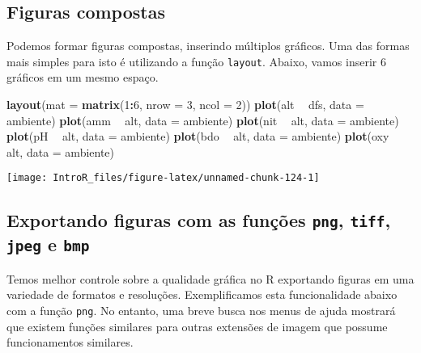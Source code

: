 \documentclass[
]{book}
\newenvironment{Shaded}{\begin{snugshade}}{\end{snugshade}}
\newcommand{\DataTypeTok}[1]{\textcolor[rgb]{0.13,0.29,0.53}{#1}}
\newcommand{\DecValTok}[1]{\textcolor[rgb]{0.00,0.00,0.81}{#1}}
\newcommand{\KeywordTok}[1]{\textcolor[rgb]{0.13,0.29,0.53}{\textbf{#1}}}
\newcommand{\NormalTok}[1]{#1}
\newcommand{\OperatorTok}[1]{\textcolor[rgb]{0.81,0.36,0.00}{\textbf{#1}}}
\newcommand{\StringTok}[1]{\textcolor[rgb]{0.31,0.60,0.02}{#1}}
\begin{document}
\hypertarget{figuras-compostas}{%
\subsection{Figuras compostas}\label{figuras-compostas}}

Podemos formar figuras compostas, inserindo múltiplos gráficos. Uma das formas mais simples para isto é utilizando a função \texttt{layout}. Abaixo, vamos inserir 6 gráficos em um mesmo espaço.

\begin{Shaded}
\begin{Highlighting}[]
\KeywordTok{layout}\NormalTok{(}\DataTypeTok{mat =} \KeywordTok{matrix}\NormalTok{(}\DecValTok{1}\OperatorTok{:}\DecValTok{6}\NormalTok{, }\DataTypeTok{nrow =} \DecValTok{3}\NormalTok{, }\DataTypeTok{ncol =} \DecValTok{2}\NormalTok{))}
\KeywordTok{plot}\NormalTok{(alt }\OperatorTok{~}\StringTok{ }\NormalTok{dfs, }\DataTypeTok{data =}\NormalTok{ ambiente)}
\KeywordTok{plot}\NormalTok{(amm }\OperatorTok{~}\StringTok{ }\NormalTok{alt, }\DataTypeTok{data =}\NormalTok{ ambiente)}
\KeywordTok{plot}\NormalTok{(nit }\OperatorTok{~}\StringTok{ }\NormalTok{alt, }\DataTypeTok{data =}\NormalTok{ ambiente)}
\KeywordTok{plot}\NormalTok{(pH }\OperatorTok{~}\StringTok{ }\NormalTok{alt, }\DataTypeTok{data =}\NormalTok{ ambiente)}
\KeywordTok{plot}\NormalTok{(bdo }\OperatorTok{~}\StringTok{ }\NormalTok{alt, }\DataTypeTok{data =}\NormalTok{ ambiente)}
\KeywordTok{plot}\NormalTok{(oxy }\OperatorTok{~}\StringTok{ }\NormalTok{alt, }\DataTypeTok{data =}\NormalTok{ ambiente)}
\end{Highlighting}
\end{Shaded}

\begin{center}\texttt{[image: IntroR\_files/figure-latex/unnamed-chunk-124-1]} \end{center}

\hypertarget{exportando-figuras-com-as-funuxe7uxf5es-png-tiff-jpeg-e-bmp}{%
\subsection{\texorpdfstring{Exportando figuras com as funções \texttt{png}, \texttt{tiff}, \texttt{jpeg} e \texttt{bmp}}{Exportando figuras com as funções png, tiff, jpeg e bmp}}\label{exportando-figuras-com-as-funuxe7uxf5es-png-tiff-jpeg-e-bmp}}

Temos melhor controle sobre a qualidade gráfica no R exportando figuras em uma variedade de formatos e resoluções. Exemplificamos esta funcionalidade abaixo com a função \texttt{png}. No entanto, uma breve busca nos menus de ajuda mostrará que existem funções similares para outras extensões de imagem que possume funcionamentos similares.
\end{document}
